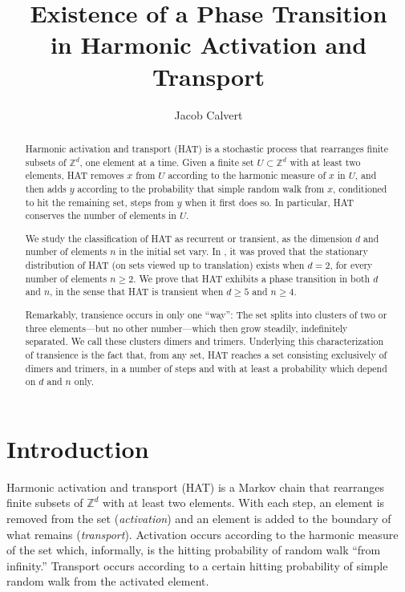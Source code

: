 \documentclass[11pt,reqno]{amsart}
\title[A Phase Transition in Harmonic Activation and Transport]{Existence of a Phase Transition\\ in Harmonic Activation and Transport}
\author{Jacob Calvert}
\theoremstyle{definition}
\numberwithin{equation}{section}
\newcommand{\Z}{\mathbb{Z}}
\newcommand{\1}{\mathbf{1}}
\begin{document}
\begin{abstract}
Harmonic activation and transport (HAT) is a stochastic process that rearranges finite subsets of $\Z^d$, one element at a time. Given a finite set $U \subset \Z^d$ with at least two elements, HAT removes $x$ from $U$ according to the harmonic measure of $x$ in $U$, and then adds $y$ according to the probability that simple random walk from $x$, conditioned to hit the remaining set, steps from $y$ when it first does so. In particular, HAT conserves the number of elements in $U$.

We study the classification of HAT as recurrent or transient, as the dimension $d$ and number of elements $n$ in the initial set vary. In \cite{calvert2021}, it was proved that the stationary distribution of HAT (on sets viewed up to translation) exists when $d = 2$, for every number of elements $n \geq 2$. We prove that HAT exhibits a phase transition in both $d$ and $n$, in the sense that HAT is transient when $d \geq 5$ and $n \geq 4$. 

Remarkably, transience occurs in only one ``way'': The set splits into clusters of two or three elements---but no other number---which then grow steadily, indefinitely separated. We call these clusters dimers and trimers. Underlying this characterization of transience is the fact that, from any set, HAT reaches a set consisting exclusively of dimers and trimers, in a number of steps and with at least a probability which depend on $d$ and $n$ only.
\end{abstract}

\maketitle

\setcounter{tocdepth}{1}
\tableofcontents

\section{Introduction}\label{sec intro}

Harmonic activation and transport (HAT) is a Markov chain that rearranges finite subsets of $\Z^d$ with at least two elements. With each step, an element is removed from the set ({\em activation}) and an element is added to the boundary of what remains ({\em transport}). Activation occurs according to the harmonic measure of the set which, informally, is the hitting probability of random walk ``from infinity.'' Transport occurs according to a certain hitting probability of simple random walk from the activated element.
\end{document}
